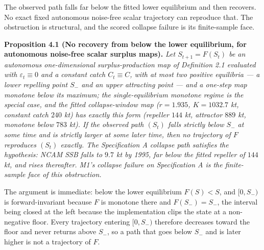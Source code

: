 \documentclass[11pt]{article}
\begin{document}
The observed path falls far below the fitted lower equilibrium and then
recovers. No exact fixed autonomous noise-free scalar trajectory can
reproduce that. The obstruction is structural, and the scored collapse
failure is its finite-sample face.

\textbf{Proposition 4.1 (No recovery from below the lower equilibrium,
for autonomous noise-free scalar surplus maps).} \emph{Let
\(S_{t+1}=F(S_t)\) be an autonomous one-dimensional surplus-production
map of Definition 2.1 evaluated with \(\varepsilon_t \equiv 0\) and a
constant catch \(C_t \equiv C\), with at most two positive equilibria --- a lower
repelling point \(S_-\) and an upper attracting point --- and a one-step
map monotone below its maximum; the single-equilibrium monotone regime
is the special case, and the fitted collapse-window map (\(r = 1.935\),
\(K = 1032.7\) kt, constant catch \(240\) kt) has exactly this form
(repeller \(144\) kt, attractor \(889\) kt, monotone below \(783\) kt).
If the observed path \((S_t)\) falls strictly below \(S_-\) at some
time and is strictly larger at some later time, then no trajectory of
\(F\) reproduces \((S_t)\) exactly. The Specification A collapse path
satisfies the hypothesis: NCAM SSB falls to \(9.7\) kt by 1995, far
below the fitted repeller of \(144\) kt, and rises thereafter. M1's
collapse failure on Specification A is the finite-sample face of this
obstruction.}

The argument is immediate: below the lower equilibrium \(F(S) < S\), and
\([0, S_-)\) is forward-invariant because \(F\) is monotone there and
\(F(S_-) = S_-\), the interval being closed at the left because the
implementation clips the state at a non-negative floor. Every trajectory
entering \([0, S_-)\) therefore decreases toward the floor and never
returns above \(S_-\), so a path that goes below \(S_-\) and is later
higher is not a trajectory of \(F\).
\end{document}
